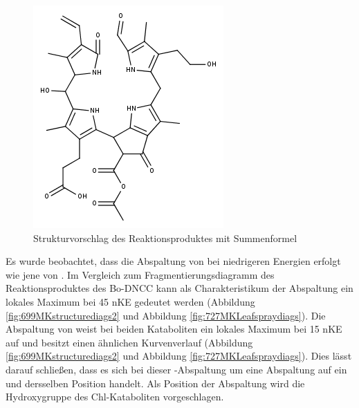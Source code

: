 \begin{figure}[!htbp]
  \centering
  \includegraphics[scale=0.6]{figures/Kapitel4/Kataboliten/fragmentation_structures/VWA_Katabolit_727.png}
  \caption[Strukturvorschlag des Reaktionsproduktes von Bo-NCC-3, Quelle: Autor]{Strukturvorschlag des Reaktionsproduktes mit Summenformel }
  \label{fig:727MKstructure}
\end{figure}

Es wurde beobachtet, dass die Abspaltung von  bei niedrigeren Energien erfolgt wie jene von . Im Vergleich zum Fragmentierungsdiagramm des Reaktionsproduktes des Bo-DNCC kann als Charakteristikum der  Abspaltung ein lokales Maximum bei 45 \gls{nKE} gedeutet werden (Abbildung \ref{fig:699MKstructurediags2} und Abbildung \ref{fig:727MKLeafspraydiags}). Die Abspaltung von  weist bei beiden Kataboliten ein lokales Maximum bei 15 \gls{nKE} auf und besitzt einen ähnlichen Kurvenverlauf (Abbildung \ref{fig:699MKstructurediags2} und Abbildung \ref{fig:727MKLeafspraydiags}). Dies lässt darauf schließen, dass es sich bei dieser -Abspaltung um eine Abspaltung auf ein und dersselben Position handelt. Als Position der Abspaltung wird die Hydroxygruppe des Chl-Kataboliten vorgeschlagen. 

